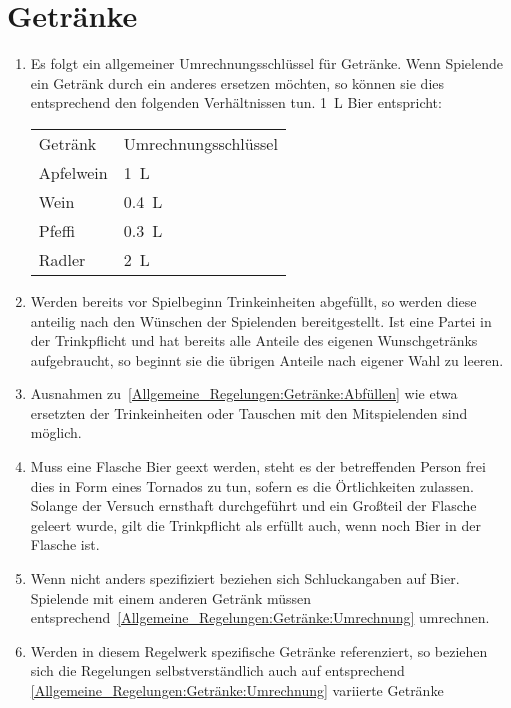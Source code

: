 \section{Getränke}\label{Allgemeine_Regelungen:Getränke}
\begin{enumerate}[label={(\arabic*)}]
	\item\label{Allgemeine_Regelungen:Getränke:Umrechnung}
	Es folgt ein allgemeiner Umrechnungsschlüssel für Getränke.
	Wenn Spielende ein Getränk durch ein anderes ersetzen möchten, so können sie dies entsprechend den folgenden Verhältnissen tun.
	\SI{1}{\liter} Bier entspricht:
	\begin{tabular}{ll}
		\toprule
		Getränk   & Umrechnungsschlüssel \\
		Apfelwein & \SI{1}{\liter} \\
		Wein 	  & \SI{0,4}{\liter} \\
		Pfeffi 	  & \SI{0,3}{\liter} \\
		Radler    & \SI{2}{\liter} \\\bottomrule
	\end{tabular}
	
	\item\label{Allgemeine_Regelungen:Getränke:Abfüllen}
	Werden bereits vor Spielbeginn Trinkeinheiten abgefüllt, so werden diese anteilig nach den Wünschen der Spielenden bereitgestellt.
	Ist eine Partei in der Trinkpflicht und hat bereits alle Anteile des eigenen Wunschgetränks aufgebraucht, so beginnt sie die übrigen Anteile nach eigener Wahl zu leeren.
	
	\item
	Ausnahmen zu~\ref{Allgemeine_Regelungen:Getränke:Abfüllen} wie etwa ersetzten der Trinkeinheiten oder Tauschen mit den Mitspielenden sind möglich.
	
	\item
	Muss eine Flasche Bier geext werden, steht es der betreffenden Person frei dies in Form eines Tornados zu tun, sofern es die Örtlichkeiten zulassen.
	Solange der Versuch ernsthaft durchgeführt und ein Großteil der Flasche geleert wurde, gilt die Trinkpflicht als erfüllt auch, wenn noch Bier in der Flasche ist.
	
	\item
	Wenn nicht anders spezifiziert beziehen sich Schluckangaben auf Bier.
	Spielende mit einem anderen Getränk müssen entsprechend~\ref{Allgemeine_Regelungen:Getränke:Umrechnung} umrechnen.

	\item
	Werden in diesem Regelwerk spezifische Getränke referenziert, so beziehen sich die Regelungen selbstverständlich auch auf entsprechend \ref{Allgemeine_Regelungen:Getränke:Umrechnung} variierte Getränke
\end{enumerate}
